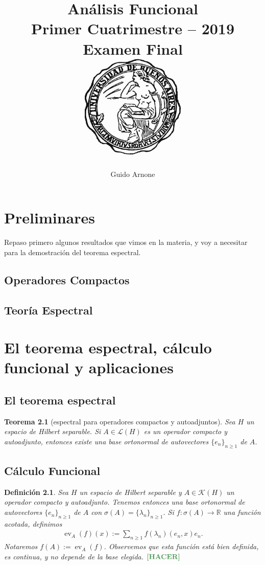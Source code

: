 \documentclass[11pt]{report}
\title{
\LARGE{Análisis Funcional}
\\
\vspace{1pt}
\small{Primer Cuatrimestre -- 2019}
\\
\vspace{0.5pt}
\large{Examen Final}
\\
\vspace{80pt}
{\includegraphics[height=5cm]{uba2.jpg}}
\vspace{80pt}
}
\author{Guido Arnone}
\date{}
\theoremstyle{colored}
\newtheorem{definition}{Definición}[section]
\newtheorem{theorem}{Teorema}[section]
\newcommand{\R}{\mathbb{R}}
\newcommand{\ev}{\operatorname{ev}}
\newcommand{\ip}[1]{( #1 )}
\newcommand{\paint}[1]{\color{color}{#1}}
\newcommand{\tpaint}[1]{\paint{\textbf{#1}}}
\begin{document}
\maketitle
\tableofcontents

\chapter{Preliminares}
Repaso primero algunos resultados que vimos en la materia, y voy a necesitar para la demostración del teorema espectral.
\section{Operadores Compactos}
\section{Teoría Espectral}
\chapter{El teorema espectral, cálculo funcional y aplicaciones}
\section{El teorema espectral}
\begin{theorem}[espectral para operadores compactos y autoadjuntos] Sea $H$ un espacio de Hilbert separable. Si $A \in \mathscr{L}(H)$ es un operador compacto y autoadjunto, entonces existe una base ortonormal de autovectores $\{e_n\}_{n \geq 1}$ de $A$.
\end{theorem}
\section{Cálculo Funcional}

\begin{definition} Sea $H$ un espacio de Hilbert separable y $A \in \mathscr{K}(H)$ un operador compacto y autoadjunto. Tenemos entonces una base ortonormal de autovectores $\{e_n\}_{n \geq 1}$ de $A$ con $\sigma(A) = \{\lambda_n\}_{n \geq 1}$. Si $f : \sigma(A) \to \R$ una función acotada, definimos
\begin{align*}
\ev_A(f)(x) := \sum_{n \geq 1}f(\lambda_n)\ip{e_n,x}e_n.
\end{align*}
Notaremos $f(A) := \ev_A(f)$. Observemos que esta función está bien definida, es continua, y no depende de la base elegida. $\tpaint{\textbf{[HACER]}}$
\end{definition}
\end{document}
